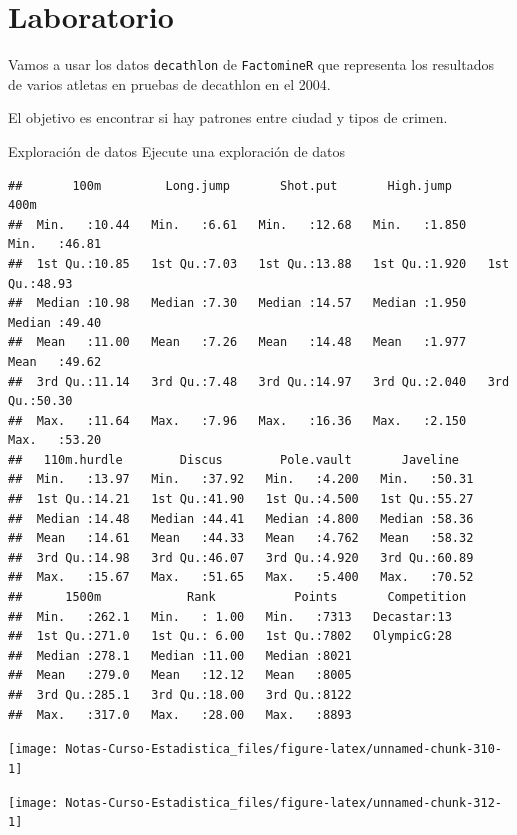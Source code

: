 \documentclass[
  12pt,
]{book}
\theoremstyle{definition}
\theoremstyle{definition}
\theoremstyle{definition}
\theoremstyle{definition}
\theoremstyle{remark}
\begin{document}
\hypertarget{laboratorio-8}{%
\section{Laboratorio}\label{laboratorio-8}}

Vamos a usar los datos \texttt{decathlon} de \texttt{FactomineR} que representa los resultados de varios atletas en pruebas de decathlon en el 2004.

El objetivo es encontrar si hay patrones entre ciudad y tipos de crimen.

Exploración de datos
Ejecute una exploración de datos

\begin{verbatim}
##       100m         Long.jump       Shot.put       High.jump          400m      
##  Min.   :10.44   Min.   :6.61   Min.   :12.68   Min.   :1.850   Min.   :46.81  
##  1st Qu.:10.85   1st Qu.:7.03   1st Qu.:13.88   1st Qu.:1.920   1st Qu.:48.93  
##  Median :10.98   Median :7.30   Median :14.57   Median :1.950   Median :49.40  
##  Mean   :11.00   Mean   :7.26   Mean   :14.48   Mean   :1.977   Mean   :49.62  
##  3rd Qu.:11.14   3rd Qu.:7.48   3rd Qu.:14.97   3rd Qu.:2.040   3rd Qu.:50.30  
##  Max.   :11.64   Max.   :7.96   Max.   :16.36   Max.   :2.150   Max.   :53.20  
##   110m.hurdle        Discus        Pole.vault       Javeline    
##  Min.   :13.97   Min.   :37.92   Min.   :4.200   Min.   :50.31  
##  1st Qu.:14.21   1st Qu.:41.90   1st Qu.:4.500   1st Qu.:55.27  
##  Median :14.48   Median :44.41   Median :4.800   Median :58.36  
##  Mean   :14.61   Mean   :44.33   Mean   :4.762   Mean   :58.32  
##  3rd Qu.:14.98   3rd Qu.:46.07   3rd Qu.:4.920   3rd Qu.:60.89  
##  Max.   :15.67   Max.   :51.65   Max.   :5.400   Max.   :70.52  
##      1500m            Rank           Points       Competition
##  Min.   :262.1   Min.   : 1.00   Min.   :7313   Decastar:13  
##  1st Qu.:271.0   1st Qu.: 6.00   1st Qu.:7802   OlympicG:28  
##  Median :278.1   Median :11.00   Median :8021                
##  Mean   :279.0   Mean   :12.12   Mean   :8005                
##  3rd Qu.:285.1   3rd Qu.:18.00   3rd Qu.:8122                
##  Max.   :317.0   Max.   :28.00   Max.   :8893
\end{verbatim}

\begin{center}\texttt{[image: Notas-Curso-Estadistica\_files/figure-latex/unnamed-chunk-310-1]} \end{center}

\begin{center}\texttt{[image: Notas-Curso-Estadistica\_files/figure-latex/unnamed-chunk-312-1]} \end{center}
\end{document}
